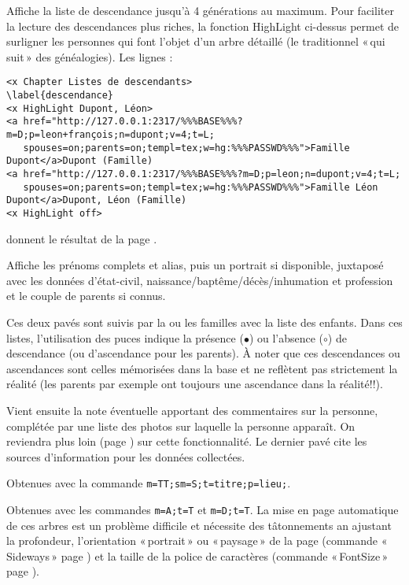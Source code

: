 \begin{description}[style=nextline]
\item[Liste de descendance] Affiche la liste de descendance jusqu'à 4
générations au maximum. Pour faciliter la lecture des descendances plus riches,
la fonction HighLight ci-dessus permet de surligner les personnes
qui font l'objet d'un arbre détaillé (le traditionnel «\,qui suit\,» des généalogies).
Les lignes :
\begin{verbatim}
<x Chapter Listes de descendants>
\label{descendance}
<x HighLight Dupont, Léon>
<a href="http://127.0.0.1:2317/%%%BASE%%%?m=D;p=leon+françois;n=dupont;v=4;t=L;
   spouses=on;parents=on;templ=tex;w=hg:%%%PASSWD%%%">Famille Dupont</a>Dupont (Famille)
<a href="http://127.0.0.1:2317/%%%BASE%%%?m=D;p=leon;n=dupont;v=4;t=L;
   spouses=on;parents=on;templ=tex;w=hg:%%%PASSWD%%%">Famille Léon Dupont</a>Dupont, Léon (Famille)
<x HighLight off>
\end{verbatim}
donnent le résultat de la page \pageref{descendance}.

\item[Page perso] Affiche les prénoms complets et alias, puis
un portrait si disponible, juxtaposé avec les
données d'état-civil, naissance/baptême/décès/inhumation et profession
et le couple de parents si connus.

Ces deux pavés sont suivis par la ou les familles avec la liste des enfants.
Dans ces listes, l'utilisation des puces indique la présence ($\bullet$)
ou l'absence ($\circ$) de descendance (ou d'ascendance pour les parents).
À noter que ces descendances ou ascendances sont celles mémorisées dans la base
et ne reflètent pas strictement la réalité (les parents par exemple ont toujours
une ascendance dans la réalité!!).

Vient ensuite la note éventuelle apportant des commentaires sur la personne,
complétée par une liste des photos sur laquelle la personne apparaît.
On reviendra plus loin (page \pageref{images}) sur cette fonctionnalité.
Le dernier pavé cite les sources d'information pour les données collectées.


\item[Liste par titre] Obtenues avec la commande
\verb|m=TT;sm=S;t=titre;p=lieu;|.

\item[Arbres] Obtenues avec les commandes \verb|m=A;t=T| et \verb|m=D;t=T|.
La mise en page automatique de ces arbres est un problème difficile et
nécessite des tâtonnements an ajustant la profondeur, l'orientation «\,portrait\,»
ou «\,paysage\,» de la page (commande «\,Sideways\,» page \pageref{sideways}) et la
taille de la police de caractères (commande «\,FontSize\,» page \pageref{fontsize}).


\end{description}

